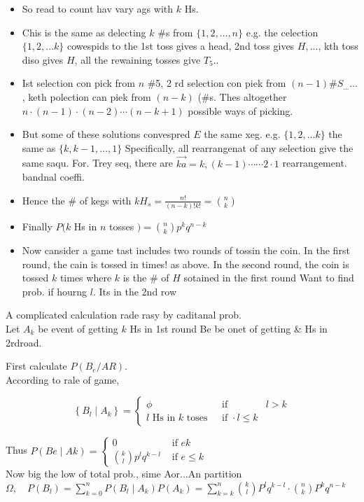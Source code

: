 \documentclass[10pt]{article}
\begin{document}
\begin{itemize}
  \item[-] So read to count hav vary ags with \(k\) Hs.
  \item[-] Chis is the same as delecting \(k\) \#s from \(\{1,2, \ldots, n\}\) e.g. the celection \(\{1,2, \ldots k\}\) cowespids to the 1st toss gives a head, 2nd toss gives \(H, \ldots\), kth toss diso gives \(H\), all the rewaining tosses give \(T_{5}\)..
  \item[-] Ist selection con pick from \(n\) \#5, 2 rd selection con piek from \((n-1) \# S_{\ldots} \ldots\), keth polection can piek from \((n-k)\) (\#s. Thes altogether \(n \cdot(n-1) \cdot(n-2) \cdots(n-k+1)\) possible ways of picking.
  \item[-] But some of these solutions convespred \(E\) the same xeg. e.g. \(\{1,2, \ldots k\}\) the same as \(\{k, k-1, \ldots, 1\}\) Specifically, all rearrangenat of any selection give the same saqu. For. Trey seq, there are \(\overrightarrow{k a}=k,(k-1) \cdots \cdots 2 \cdot 1\) rearrangement. bandnal coeffi.
  \item[-] Hence the \# of kegs with \(k H_{s}=\frac{n!}{(n-k)!k!}=\binom{n}{k}\)
  \item[-] Finally \(P(k\) Hs in \(n\) tosses \()=\binom{n}{k} p^{k} q^{n-k}\)
  \item[-] Now cansider a game tast includes two rounds of tossin the
    coin. In the first round, the cain is tossed in times! as
    above. In the second round, the coin is tossed \(k\) times where \(k\) is the \(\#\) of \(H\) sotained in the first round Want to find prob. if hourng \(l\). Its in the 2nd row
\end{itemize}

A complicated calculation rade rasy by caditanal prob.\\
Let \(A_{k}\) be event of getting \(k\) Hs in 1st round Be be onet of getting \& Hs in 2rdroad.

First calculate \(P\left(B_{e} / A R\right)\).\\
According to rale of game,

\[
\left\{B_{l} \mid A_{k}\right\}=\left\{\begin{array}{lll}
\phi & \text { if } & l>k \\
l \text { Hs in } k \text { toses } & \text { if } \cdot l \leq k
\end{array}\right.
\]

Thus \(P(B e \mid A k)= \begin{cases}0 & \text { if } e k \\ \binom{k}{l} p^{l} q^{k-l} & \text { if } e \leq k\end{cases}\)\\
Now big the low of total prob., sime Aor...An partition \(\Omega, \quad P\left(B_{l}\right)=\sum_{k=0}^{n} P\left(B_{l} \mid A_{k}\right) P\left(A_{k}\right)=\sum_{k=k}^{n}\binom{k}{l} P^{l} q^{k-l} \cdot\binom{n}{k} P^{k} q^{n-k}\)
\end{document}
